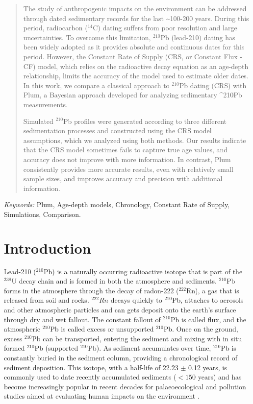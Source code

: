 \documentclass [10pt] {article}
\begin{document}
\begin{abstract}
The study of anthropogenic impacts on the environment can be addressed through dated sedimentary records for the last \sim 100-200 years. During this period, radiocarbon ($^{14}$C) dating suffers from poor resolution and large uncertainties. To overcome this limitation, $^{210}$Pb (lead-210) dating has been widely adopted as it provides absolute and continuous dates for this period. However, the Constant Rate of Supply (CRS, or Constant Flux - CF) model, which relies on the radioactive decay equation as an age-depth relationship, limits the accuracy of the model used to estimate older dates. In this work, we compare a classical approach to $^{210}$Pb dating (CRS) with Plum, a Bayesian approach developed for analyzing sedimentary ^210Pb measurements. 

Simulated $^{210}$Pb profiles were generated according to three different sedimentation processes and constructed using the CRS model assumptions, which we analyzed using both methods. Our results indicate that the CRS model sometimes fails to capture true age values, and accuracy does not improve with more information. In contrast, Plum consistently provides more accurate results, even with relatively small sample sizes, and improves accuracy and precision with additional information.\end{abstract}
	\noindent%
	{\it Keywords:} Plum, Age-depth models, Chronology, Constant Rate of Supply, Simulations, Comparison.
	\vfill
	\newpage

\section{Introduction}

	Lead-210 ($^{210}$Pb) is a naturally occurring radioactive isotope that is part of the $^{238}$U decay chain and is formed in both the atmosphere and sediments. $^{210}$Pb forms in the atmosphere through the decay of radon-222 ($^{222}$Rn), a gas that is released from soil and rocks. $^{222}Rn$ decays quickly to $^{210}$Pb, attaches to aerosols and other atmospheric particles and can gets deposit onto the earth's surface through dry and wet fallout. The constant fallout of $^{210}$Pb is called flux, and the atmospheric $^{210}$Pb is called excess or unsupported $^{210}$Pb. Once on the ground, excess $^{210}$Pb can be transported, entering the sediment and mixing with in situ formed $^{210}$Pb (supported $^{210}$Pb). As sediment accumulates over time, $^{210}$Pb is constantly buried in the sediment column, providing a chronological record of sediment deposition. This isotope, with a half-life of 22.23 $\pm$ 0.12 years, is commonly used to date recently accumulated sediments ($<150$ years) and has become increasingly popular in recent decades for palaeoecological and pollution studies aimed at evaluating human impacts on the environment \citep[e.g.,][]{Courtney2019}.
\end{document}
